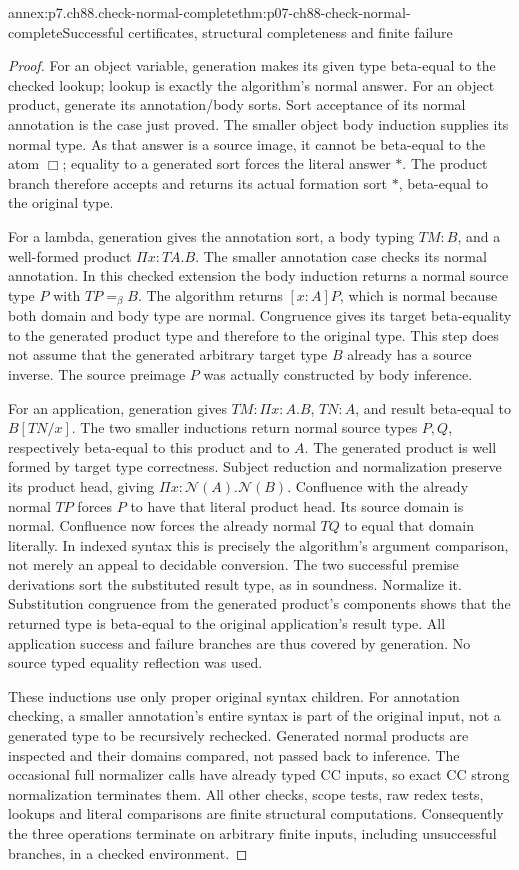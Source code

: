 \begin{annexitem}{annex:p7.ch88.check-normal-complete}{thm:p07-ch88-check-normal-complete}{Successful certificates, structural completeness and finite failure}
\begin{proof}
For an object variable, generation makes its given type beta-equal
to the checked lookup; lookup is exactly the algorithm's normal
answer. For an object product, generate its annotation/body sorts.
Sort acceptance of its normal annotation is the case just proved.
The smaller object body induction supplies its normal type. As that
answer is a source image, it cannot be beta-equal to the atom
\(\Box\); equality to a generated sort forces the literal answer
\(\ast\). The product branch therefore accepts and returns its
actual formation sort \(\ast\), beta-equal to the original type.

For a lambda, generation gives the annotation sort, a body typing
\(TM:B\), and a well-formed product \(\Pi x:TA.B\). The smaller
annotation case checks its normal annotation. In this checked
extension the body induction returns a normal source type \(P\)
with \(TP=_\beta B\). The algorithm returns \([x:A]P\), which
is normal because both domain and body type are normal. Congruence
gives its target beta-equality to the generated product type and
therefore to the original type. This step does not assume that the
generated arbitrary target type \(B\) already has a source inverse.
The source preimage \(P\) was actually constructed by body inference.

For an application, generation gives
\(TM:\Pi x:A.B\), \(TN:A\), and result beta-equal to
\(B[TN/x]\). The two smaller inductions return normal source types
\(P,Q\), respectively beta-equal to this product and to \(A\).
The generated product is well formed by target type correctness.
Subject reduction and normalization preserve its product head, giving
\(\Pi x:\mathcal N(A).\mathcal N(B)\). Confluence with the
already normal \(TP\) forces \(P\) to have that literal product
head. Its source domain is normal. Confluence now forces the already
normal \(TQ\) to equal that domain literally. In indexed syntax
this is precisely the algorithm's argument comparison, not merely
an appeal to decidable conversion. The two successful premise
derivations sort the substituted result type, as in soundness.
Normalize it. Substitution congruence from the generated product's
components shows that the returned type is beta-equal to the
original application's result type. All application success and
failure branches are thus covered by generation. No source typed
equality reflection was used.

These inductions use only proper original syntax children. For
annotation checking, a smaller annotation's entire syntax is part
of the original input, not a generated type to be recursively
rechecked. Generated normal products are inspected and their domains
compared, not passed back to inference. The occasional full normalizer
calls have already typed CC inputs, so exact CC strong normalization
terminates them. All other checks, scope tests, raw redex tests,
lookups and literal comparisons are finite structural computations.
Consequently the three operations terminate on arbitrary finite
inputs, including unsuccessful branches, in a checked environment.


\end{proof}
\end{annexitem}
